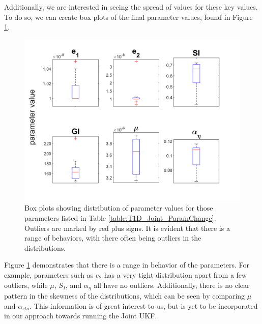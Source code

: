Additionally, we are interested in seeing the spread of values for these key values. To do so, we can create box plots of the final parameter values, found in Figure \ref{fig:T1D_Joint_Parameter_BoxPlots}.

\begin{figure}[H]
    \centering
    \includegraphics[width=15cm]{Kalman_Filter_Images/joint_param_boxplots.png}
    \caption{Box plots showing distribution of parameter values for those parameters listed in Table \ref{table:T1D_Joint_ParamChange}. Outliers are marked by red plus signs. It is evident that there is a range of behaviors, with there often being outliers in the distributions.}
    \label{fig:T1D_Joint_Parameter_BoxPlots}
\end{figure}

Figure \ref{fig:T1D_Joint_Parameter_BoxPlots} demonstrates that there is a range in behavior of the parameters. For example, parameters such as $e_2$ has a very tight distribution apart from a few outliers, while $\mu$, $S_I$, and $\alpha_{\eta}$ all have no outliers. Additionally, there is no clear pattern in the skewness of the distributions, which can be seen by comparing $\mu$ and $\alpha_{eta}$. This information is of great interest to us, but is yet to be incorporated in our approach towards running the Joint UKF. 




